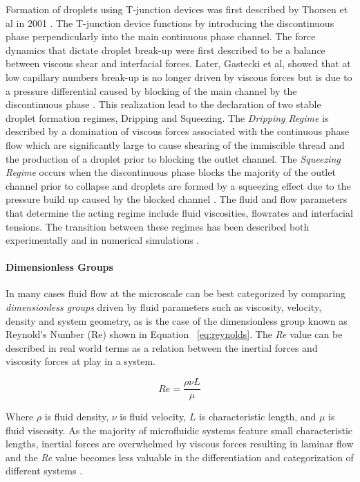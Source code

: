 Formation of droplets using T-junction devices was first described by Thorsen et al in 2001 \cite{Thorsen2001}. The T-junction device functions by introducing the discontinuous phase perpendicularly into the main continuous phase channel. The force dynamics that dictate droplet break-up were first described to be a balance between viscous shear and interfacial forces. Later, Gastecki et al, showed that at low capillary numbers break-up is no longer driven by viscous forces but is due to a pressure differential caused by blocking of the main channel by the discontinuous phase \cite{Garstecki2006}. This realization lead to the declaration of two stable droplet formation regimes, Dripping and Squeezing. The
\emph{Dripping Regime} is described by a domination of viscous forces associated with the continuous phase flow which are significantly large to cause shearing of the immiscible thread and the production of a droplet prior to blocking the outlet channel. The \emph{Squeezing Regime} occurs when the discontinuous phase blocks the majority of the outlet channel prior to collapse and droplets are formed by a squeezing effect due to the pressure build up caused by the blocked channel \cite{Shui2007a}. The fluid and flow parameters that determine the acting regime include fluid viscosities, flowrates and interfacial tensions. The transition between these regimes has been described both experimentally and in numerical simulations \cite{Christopher2008,DeMenech2008}. 

\paragraph{Dimensionless Groups} In many cases fluid flow at the microscale can be best categorized by comparing \emph{dimensionless groups} driven by fluid parameters such as viscosity, velocity, density and system geometry, as is the case of the dimensionless group known as Reynold's Number (Re) shown in Equation ~\vref{eq:reynolds}. The \emph{Re} value can be described in real world terms as a relation between the inertial forces and viscosity forces at play in a system.

\begin{equation}
Re =\frac {\rho \nu L}{\mu}
\label{eq:reynolds}
\end{equation}

Where $\rho$ is fluid density, $\nu$ is fluid velocity, $L$ is characteristic length, and $\mu$ is fluid viscosity. As the majority of microfluidic systems feature small characteristic lengths, inertial forces are overwhelmed by viscous forces resulting in laminar flow and the \emph{Re} value becomes less valuable in the differentiation and categorization of different systems \cite{Kleinstreuer2013}.

